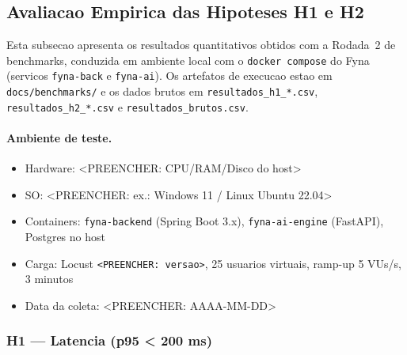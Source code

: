 %
%        

\subsection{Avaliacao Empirica das Hipoteses H1 e H2}
\label{sec:avaliacao-empirica}

Esta subsecao apresenta os resultados quantitativos obtidos com a Rodada~2
de benchmarks, conduzida em ambiente local com o \texttt{docker compose}
do Fyna (servicos \texttt{fyna-back} e \texttt{fyna-ai}). Os artefatos de
execucao estao em \texttt{docs/benchmarks/} e os dados brutos em
\texttt{resultados\_h1\_*.csv}, \texttt{resultados\_h2\_*.csv} e
\texttt{resultados\_brutos.csv}.

\paragraph{Ambiente de teste.}
\begin{itemize}
  \item Hardware: <PREENCHER: CPU/RAM/Disco do host>
  \item SO: <PREENCHER: ex.: Windows 11 / Linux Ubuntu 22.04>
  \item Containers: \texttt{fyna-backend} (Spring Boot 3.x), \texttt{fyna-ai-engine} (FastAPI), Postgres no host
  \item Carga: Locust \texttt{<PREENCHER: versao>}, 25 usuarios virtuais, ramp-up 5 VUs/s, 3 minutos
  \item Data da coleta: <PREENCHER: AAAA-MM-DD>
\end{itemize}

\subsubsection{H1 — Latencia (p95 < 200 ms)}
\label{sec:h1}

